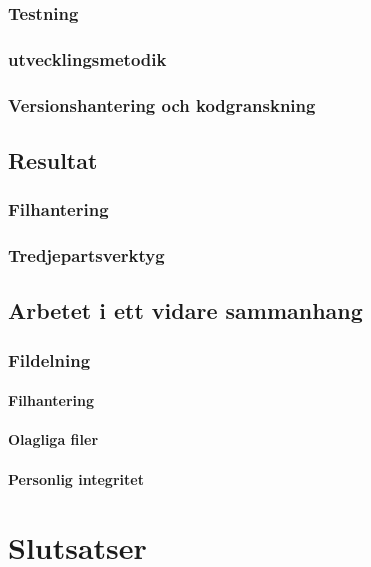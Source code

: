 \documentclass[a4paper,12pt,oneside,final]{extbook}
\begin{document}
\subsection{Testning}

\subsection{utvecklingsmetodik}

\subsection{Versionshantering och kodgranskning}

\section{Resultat}

\subsection{Filhantering}

\subsection{Tredjepartsverktyg}

\section{Arbetet i ett vidare sammanhang}

\subsection{Fildelning}

\subsubsection{Filhantering}

\subsubsection{Olagliga filer}

\subsubsection{Personlig integritet}

\chapter{Slutsatser}
\end{document}
